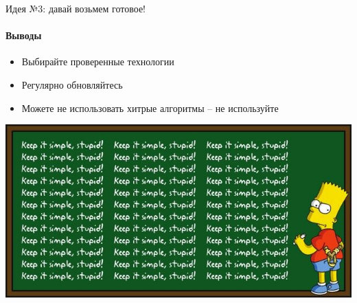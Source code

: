 \begin{frame}[t]{Идея №3: давай возьмем готовое!}
\framesubtitle{Выводы}

\begin{itemize}
  \item Выбирайте проверенные технологии
  \pause
  \item Регулярно обновляйтесь
  \pause
  \item Можете не использовать хитрые алгоритмы -- не используйте
\end{itemize}

\pause

\begin{center}
\includegraphics[width=.7\textwidth]{production/kiss/3-bart-kiss.jpg}
\end{center}

\end{frame}


% 
% 
% 
% 
% 
% 
% 
% 
% 
% 
% 


